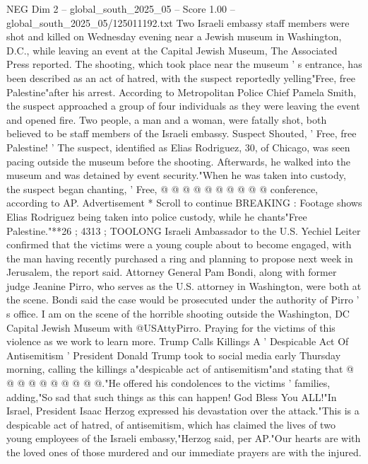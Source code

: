 \begin{textsample}{NEG Dim 2 – global\_south\_2025\_05 – Score 1.00 – global\_south\_2025\_05/125011192.txt}  \label{ex:f2_neg_406}
Two Israeli embassy staff members were shot and killed on Wednesday evening near a Jewish museum in Washington, D.C., while leaving an event at the Capital Jewish Museum, The Associated Press reported.
The shooting, which took place near the museum ' s entrance, has been described as an act of hatred, with the suspect reportedly yelling"Free, free Palestine"after his arrest.
According to Metropolitan Police Chief Pamela Smith, the suspect approached a group of four individuals as they were leaving the event and opened fire.
Two people, a man and a woman, were fatally shot, both believed to be staff members of the Israeli embassy.
Suspect Shouted, ' Free, free Palestine! ' The suspect, identified as Elias Rodriguez, 30, of Chicago, was seen pacing outside the museum before the shooting.
Afterwards, he walked into the museum and was detained by event security."When he was taken into custody, the suspect began chanting, ' Free, @ @ @ @ @ @ @ @ @ @ conference, according to AP.
Advertisement * Scroll to continue BREAKING : Footage shows Elias Rodriguez being taken into police custody, while he chants"Free Palestine."**26 ; 4313 ; TOOLONG Israeli Ambassador to the U.S.
Yechiel Leiter confirmed that the victims were a young couple about to become engaged, with the man having recently purchased a ring and planning to propose next week in Jerusalem, the report said.
Attorney General Pam Bondi, along with former judge Jeanine Pirro, who serves as the U.S. attorney in Washington, were both at the scene.
Bondi said the case would be prosecuted under the authority of Pirro ' s office.
I am on the scene of the horrible shooting outside the Washington, DC Capital Jewish Museum with @USAttyPirro.
Praying for the victims of this violence as we work to learn more.
Trump Calls Killings A ' Despicable Act Of Antisemitism ' President Donald Trump took to social media early Thursday morning, calling the killings a"despicable act of antisemitism"and stating that @ @ @ @ @ @ @ @ @ @."He offered his condolences to the victims ' families, adding,"So sad that such things as this can happen!
God Bless You ALL!"In Israel, President Isaac Herzog expressed his devastation over the attack."This is a despicable act of hatred, of antisemitism, which has claimed the lives of two young employees of the Israeli embassy,"Herzog said, per AP."Our hearts are with the loved ones of those murdered and our immediate prayers are with the injured.

\end{textsample}

